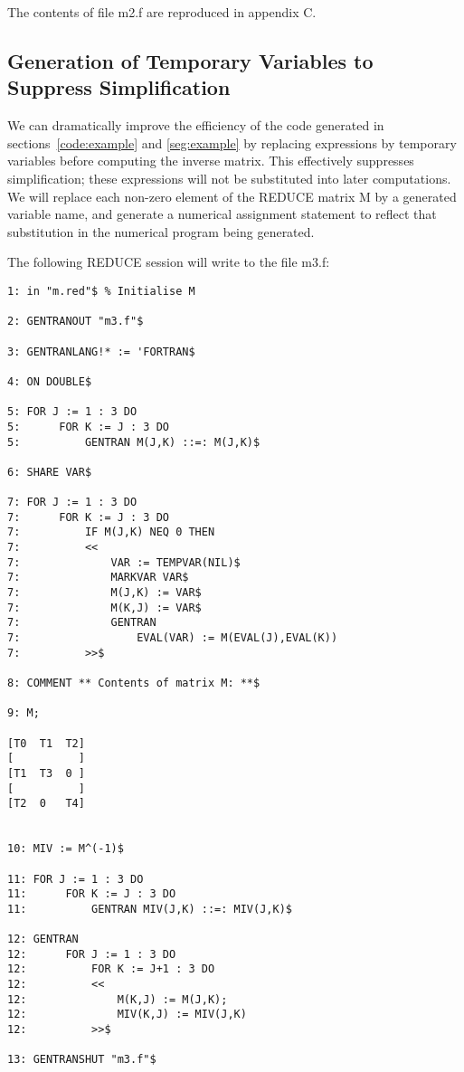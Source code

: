 The contents of file m2.f are reproduced in appendix C.

\subsection{Generation of Temporary Variables to Suppress Simplification}
\label{tempvar:example}
We can dramatically improve the efficiency of the code generated
in sections~\ref{code:example} and \ref{seg:example}
by replacing expressions by temporary variables before computing the
inverse matrix.  This effectively suppresses simplification; these
expressions will not be substituted into later computations.  We
will replace each non-zero element of the REDUCE matrix M by a
generated variable name, and generate a numerical assignment statement
to reflect that substitution in the numerical program being generated.

The following REDUCE session will write to the file m3.f:
\begin{verbatim}
1: in "m.red"$ % Initialise M

2: GENTRANOUT "m3.f"$ 

3: GENTRANLANG!* := 'FORTRAN$ 

4: ON DOUBLE$

5: FOR J := 1 : 3 DO 
5:      FOR K := J : 3 DO 
5:          GENTRAN M(J,K) ::=: M(J,K)$ 

6: SHARE VAR$ 

7: FOR J := 1 : 3 DO 
7:      FOR K := J : 3 DO 
7:          IF M(J,K) NEQ 0 THEN 
7:          << 
7:              VAR := TEMPVAR(NIL)$ 
7:              MARKVAR VAR$ 
7:              M(J,K) := VAR$ 
7:              M(K,J) := VAR$ 
7:              GENTRAN 
7:                  EVAL(VAR) := M(EVAL(J),EVAL(K)) 
7:          >>$ 

8: COMMENT ** Contents of matrix M: **$ 

9: M; 

[T0  T1  T2]
[          ]
[T1  T3  0 ]
[          ]
[T2  0   T4]


10: MIV := M^(-1)$ 

11: FOR J := 1 : 3 DO 
11:      FOR K := J : 3 DO 
11:          GENTRAN MIV(J,K) ::=: MIV(J,K)$ 

12: GENTRAN 
12:      FOR J := 1 : 3 DO 
12:          FOR K := J+1 : 3 DO 
12:          << 
12:              M(K,J) := M(J,K); 
12:              MIV(K,J) := MIV(J,K) 
12:          >>$ 

13: GENTRANSHUT "m3.f"$ 
\end{verbatim}


